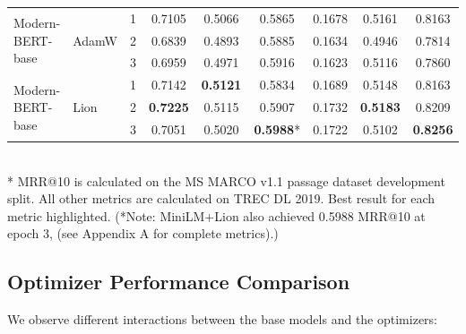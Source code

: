 \documentclass[conference]{IEEEtran}
\begin{document}
\begin{table}[htbp]
\begin{tabular}{l l c c c c c c c}
\midrule
\multirow{3}{*}{Modern-BERT-base} & \multirow{3}{*}{AdamW}
    & 1 & 0.7105 & 0.5066 & 0.5865 & 0.1678 & 0.5161 & 0.8163 \\
    & & 2 & 0.6839 & 0.4893 & 0.5885 & 0.1634 & 0.4946 & 0.7814 \\
    & & 3 & 0.6959 & 0.4971 & 0.5916 & 0.1623 & 0.5116 & 0.7860 \\ %
\midrule
\multirow{3}{*}{Modern-BERT-base} & \multirow{3}{*}{Lion}
    & 1 & 0.7142 & \cellcolor{yellow!50}\textbf{0.5121} & 0.5834 & 0.1689 & 0.5148 & 0.8163 \\
    & & 2 & \cellcolor{yellow!50}\textbf{0.7225} & 0.5115 & 0.5907 & 0.1732 & \cellcolor{yellow!50}\textbf{0.5183} & 0.8209 \\
    & & 3 & 0.7051 & 0.5020 & \cellcolor{yellow!50}\textbf{0.5988}* & 0.1722 & 0.5102 & \cellcolor{yellow!50}\textbf{0.8256} \\
\bottomrule
\end{tabular}
\vspace{1em}\\
\footnotesize{* MRR@10 is calculated on the MS MARCO v1.1 passage dataset development split. All other metrics are calculated on TREC DL 2019. Best result for each metric highlighted. (*Note: MiniLM+Lion also achieved 0.5988 MRR@10 at epoch 3, (see Appendix A for complete metrics).)}
\end{table}

\subsection{Optimizer Performance Comparison}
We observe different interactions between the base models and the optimizers:
\end{document}

